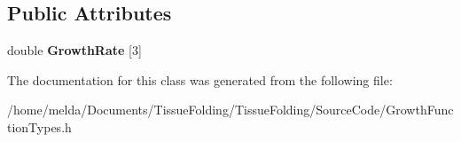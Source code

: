 \subsection*{Public Attributes}
\begin{DoxyCompactItemize}
\item 
\hypertarget{classUniformGrowthFunction_af78591902b0cc391a62f3093fd14ad10}{}double {\bfseries Growth\+Rate} \mbox{[}3\mbox{]}\label{classUniformGrowthFunction_af78591902b0cc391a62f3093fd14ad10}

\end{DoxyCompactItemize}


The documentation for this class was generated from the following file\+:\begin{DoxyCompactItemize}
\item 
/home/melda/\+Documents/\+Tissue\+Folding/\+Tissue\+Folding/\+Source\+Code/Growth\+Function\+Types.\+h\end{DoxyCompactItemize}
